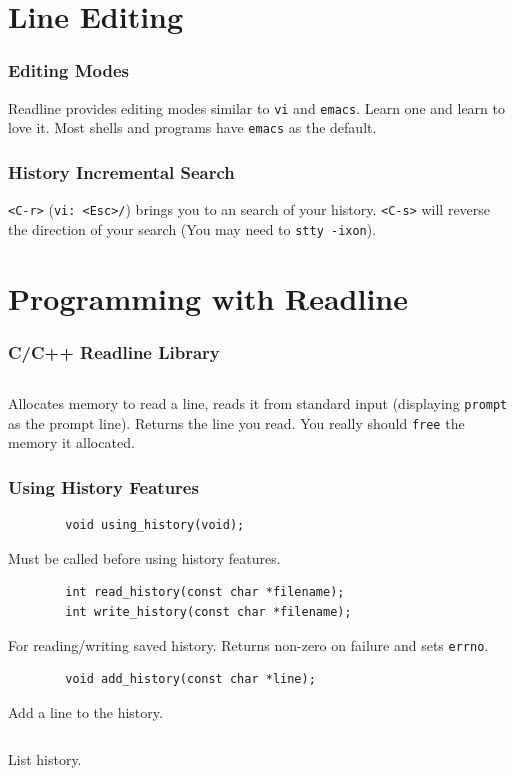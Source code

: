 \documentclass{beamer}
\begin{document}
\section{Line Editing}
\begin{frame}
    \frametitle{Editing Modes}
    Readline provides editing modes similar to \texttt{vi} and \texttt{emacs}.
    Learn one and learn to love it. Most shells and programs have
    \texttt{emacs} as the default.
\end{frame}

\begin{frame}
    \frametitle{History Incremental Search}
    \texttt{<C-r>} (\texttt{vi: <Esc>/}) brings you to an search of your
    history. \texttt{<C-s>} will reverse the direction of your search (You may
    need to \texttt{stty -ixon}).
\end{frame}

\section{Programming with Readline}
\begin{frame}[fragile=singleslide]
    \frametitle{C/C++ Readline Library}
    \inputminted{c}{codesnip/readlineinclude.c}

    Allocates memory to read a line, reads it from standard input (displaying
    \texttt{prompt} as the prompt line). Returns the line you read. You
    really should \texttt{free} the memory it allocated.
\end{frame}

\begin{frame}[fragile]
    \frametitle{Using History Features}
    \begin{verbatim}
        void using_history(void);
    \end{verbatim}
    Must be called before using history features.
    \pause

    \begin{verbatim}
        int read_history(const char *filename);
        int write_history(const char *filename);
    \end{verbatim}
    For reading/writing saved history. Returns non-zero on failure and sets
    \texttt{errno}.
    \pause

    \begin{verbatim}
        void add_history(const char *line);
    \end{verbatim}
    Add a line to the history.
    \pause

    \inputminted{c}{codesnip/historylist.c}
    List history.
\end{frame}
\end{document}
